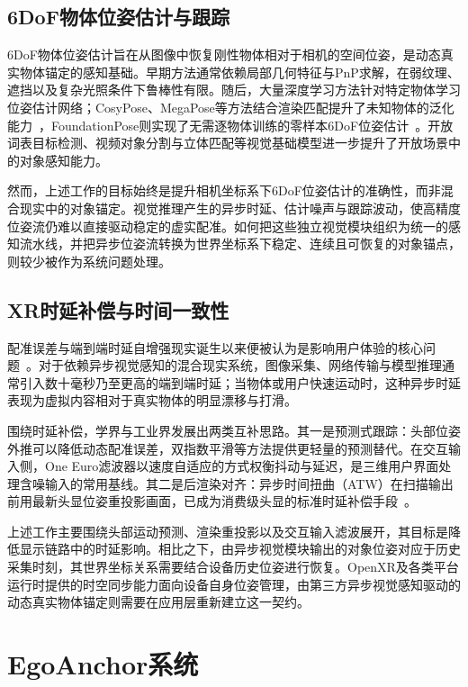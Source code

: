 \documentclass[review]{vgtc}
\begin{document}
\subsection{6DoF物体位姿估计与跟踪}

6DoF物体位姿估计旨在从图像中恢复刚性物体相对于相机的空间位姿，是动态真实物体锚定的感知基础。早期方法通常依赖局部几何特征与PnP求解，在弱纹理、遮挡以及复杂光照条件下鲁棒性有限。随后，大量深度学习方法针对特定物体学习位姿估计网络；CosyPose、MegaPose等方法结合渲染匹配提升了未知物体的泛化能力~\cite{cosypose2020,megapose2022}，FoundationPose则实现了无需逐物体训练的零样本6DoF位姿估计~\cite{foundationpose2023}。开放词表目标检测、视频对象分割与立体匹配等视觉基础模型进一步提升了开放场景中的对象感知能力。

然而，上述工作的目标始终是提升相机坐标系下6DoF位姿估计的准确性，而非混合现实中的对象锚定。视觉推理产生的异步时延、估计噪声与跟踪波动，使高精度位姿流仍难以直接驱动稳定的虚实配准。如何把这些独立视觉模块组织为统一的感知流水线，并把异步位姿流转换为世界坐标系下稳定、连续且可恢复的对象锚点，则较少被作为系统问题处理。

\subsection{XR时延补偿与时间一致性}

配准误差与端到端时延自增强现实诞生以来便被认为是影响用户体验的核心问题~\cite{azuma1994improving,diluca2010latency}。对于依赖异步视觉感知的混合现实系统，图像采集、网络传输与模型推理通常引入数十毫秒乃至更高的端到端时延；当物体或用户快速运动时，这种异步时延表现为虚拟内容相对于真实物体的明显漂移与打滑。

围绕时延补偿，学界与工业界发展出两类互补思路。其一是预测式跟踪：头部位姿外推可以降低动态配准误差，双指数平滑等方法提供更轻量的预测替代。在交互输入侧，One Euro滤波器以速度自适应的方式权衡抖动与延迟，是三维用户界面处理含噪输入的常用基线。其二是后渲染对齐：异步时间扭曲（ATW）在扫描输出前用最新头显位姿重投影画面，已成为消费级头显的标准时延补偿手段~\cite{vanwaveren2016atw}。

上述工作主要围绕头部运动预测、渲染重投影以及交互输入滤波展开，其目标是降低显示链路中的时延影响。相比之下，由异步视觉模块输出的对象位姿对应于历史采集时刻，其世界坐标关系需要结合设备历史位姿进行恢复。OpenXR及各类平台运行时提供的时空同步能力面向设备自身位姿管理，由第三方异步视觉感知驱动的动态真实物体锚定则需要在应用层重新建立这一契约。

\section{EgoAnchor系统}\label{sec:system}
\end{document}
